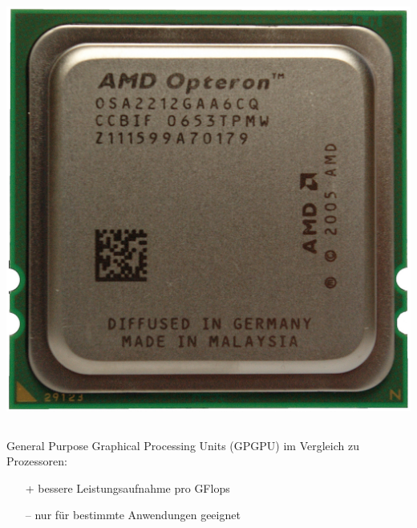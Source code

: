 \begin{frame}
\begin{columns}
\begin{column}{0.5\linewidth}
        \centerline{\includegraphics[height=0.3\textheight]{AMD_Opteron_2212_IMGP1795.jpg}}
    \end{column}\end{columns}\vspace{1.5\baselineskip}
    General Purpose Graphical Processing Units (GPGPU) im Vergleich zu Prozessoren:
    \begin{itemize}
        \item[+] bessere Leistungsaufnahme pro GFlops
        \item[–] nur für bestimmte Anwendungen geeignet

\end{itemize}
\end{frame}
